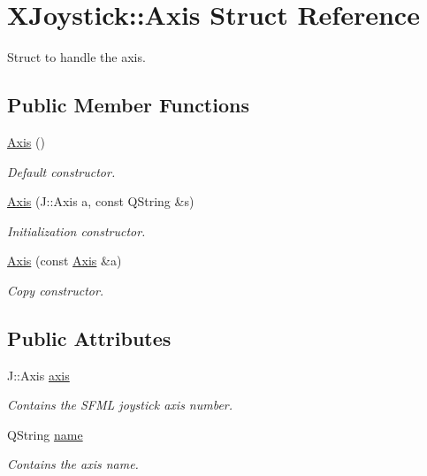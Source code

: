 \hypertarget{struct_x_joystick_1_1_axis}{}\section{X\+Joystick\+:\+:Axis Struct Reference}
\label{struct_x_joystick_1_1_axis}


Struct to handle the axis.  


\subsection*{Public Member Functions}
\begin{DoxyCompactItemize}
\item 
\hyperlink{struct_x_joystick_1_1_axis_a4bd767061a9044a6d0595963230d0d16}{Axis} ()
\begin{DoxyCompactList}\small\item\em Default constructor. \end{DoxyCompactList}\item 
\hyperlink{struct_x_joystick_1_1_axis_a19fab3e8d9efd900e5ddf66a60e8e9d3}{Axis} (J\+::\+Axis a, const Q\+String \&s)
\begin{DoxyCompactList}\small\item\em Initialization constructor. \end{DoxyCompactList}\item 
\hyperlink{struct_x_joystick_1_1_axis_addee714315da584b032e73873651f2ad}{Axis} (const \hyperlink{struct_x_joystick_1_1_axis}{Axis} \&a)
\begin{DoxyCompactList}\small\item\em Copy constructor. \end{DoxyCompactList}\end{DoxyCompactItemize}
\subsection*{Public Attributes}
\begin{DoxyCompactItemize}
\item 
J\+::\+Axis \hyperlink{struct_x_joystick_1_1_axis_a0e35efb99b26bae67505ef6184c46e98}{axis}
\begin{DoxyCompactList}\small\item\em Contains the S\+F\+M\+L joystick axis number. \end{DoxyCompactList}\item 
Q\+String \hyperlink{struct_x_joystick_1_1_axis_af0b18b33da6b801b29ab95a1acc3c0c8}{name}
\begin{DoxyCompactList}\small\item\em Contains the axis name. \end{DoxyCompactList}\end{DoxyCompactItemize}


